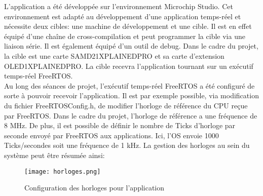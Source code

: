 \indent L'application a été développée sur l'environnement Microchip Studio.
Cet environnement est adapté au développement d'une application temps-réel et nécessite deux cibles: une machine de développement et une cible.
Il est en effet équipé d'une chaîne de cross-compilation et peut programmer la cible via une liaison série.
Il est également équipé d'un outil de debug.
Dans le cadre du projet, la cible est une carte SAMD21XPLAINEDPRO et sa carte d'extension OLED1XPLAINEDPRO.
La cible recevra l'application tournant sur un exécutif temps-réel FreeRTOS.\\
\indent Au long des séances de projet, l'exécutif temps-réel FreeRTOS a été configuré de sorte à pouvoir recevoir l'application.
Il est par exemple possible, via modification du fichier FreeRTOSConfig.h, de modifier l'horloge de référence du CPU reçue par FreeRTOS.
Dans le cadre du projet, l'horloge de référence a une fréquence de 8 MHz.
De plus, il est possible de définir le nombre de Ticks d'horloge par seconde envoyé par FreeRTOS aux applications.
Ici, l'OS envoie 1000 Ticks/secondes soit une fréquence de 1 kHz.
La gestion des horloges au sein du système peut être résumée ainsi:

\begin{figure}[h]
    \centering
    \texttt{[image: horloges.png]}
    \caption{Configuration des horloges pour l'application}
    \label{fig:clock}
\end{figure}

